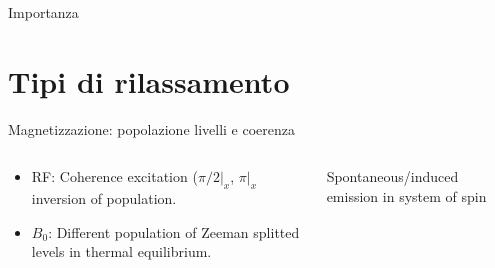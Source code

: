 \begin{frame}{Importanza }
    
\end{frame}

\section{Tipi di rilassamento}

\begin{frame}{Magnetizzazione: popolazione livelli e coerenza}
\begin{columns}[T]
\begin{column}{0.5\textwidth}
\begin{itemize}
\item RF: Coherence excitation ($\pi/2|_x$, $\pi|_x$ inversion of population.
\item $B_0$: Different population of Zeeman splitted levels in thermal equilibrium.
\end{itemize}
\end{column}
\begin{column}{0.5\textwidth}
\begin{block}{Spontaneous/induced emission in system of spin}

\end{block}
\end{column}
\end{columns}
\end{frame}

